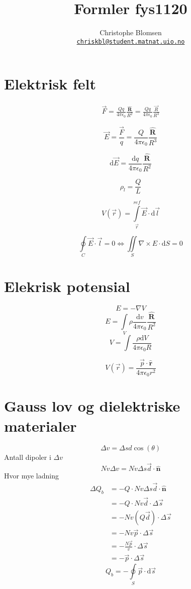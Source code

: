 \documentclass[a4paper,10pt,english]{article}
\title{Formler fys1120}
\author{
		Christophe Blomsen\\
		\texttt{\href{mailto:chriskbl@student.matnat.uio.no}{chriskbl@student.matnat.uio.no}}
		}
\newcommand{\dd}[1]{\mathrm{d}#1}
\newcommand{\uvec}[1]{\boldsymbol{\hat{\textbf{#1}}}}
\begin{document}
	\begin{titlepage}
	\maketitle
	\tableofcontents
	\end{titlepage}


\section{Elektrisk felt}

\begin{align*}
	\vec{F} = \frac{Qq}{4 \pi \epsilon_0}	\frac{ \uvec{R}}{R^2} = \frac{ Qq}{4 \pi \epsilon_0} \frac{ \vec{R}}{R^3}
\end{align*}

\[
	\vec{E}= \frac{ \vec{F}}{q} = \frac{Q}{4 \pi \epsilon_0} \frac{\uvec{R}}{R^3}
\] 

\[
	\dd{ \vec{E}} = \frac{ \dd{ q} }{4 \pi \epsilon_0} \frac{ \uvec{R}}{R^2}
\] 

\[
\rho_l = \frac{ Q}{L}
\] 

\[
	V(\vec{r}) = \int \limits_{\vec{r}}^{ref} \vec{E} \cdot \dd{ \vec{l}} 
\] 

\[
	\oint \limits_C \vec{E} \cdot \vec{l} = 0 \Leftrightarrow \iint \limits_S \nabla \times E \cdot \dd{ S} =0
\] 
\section{Elekrisk potensial}

\[
	E = - \nabla V
\] 
\[
	E = \int \limits_V \rho \frac{ \dd{ v} }{4 \pi \epsilon_0} \frac{ \uvec{R}}{R^2}
\] 
\[
	V = \int \frac{\rho \dd{ V} }{4 \pi \epsilon_0 R}
\] 

\[
	V(\vec{r}) = \frac{ \vec{p} \cdot \uvec{r}}{4 \pi \epsilon_0 r^2}
\] 
\section{Gauss lov og dielektriske materialer}
\[
\Delta v = \Delta s d \cos( \theta) 
\] 
Antall dipoler i $\Delta v$
 \[
	 Nv \Delta v = Nv \Delta s \vec{d} \cdot \uvec{n}
\] 
Hvor mye ladning
\begin{align*}
	\Delta Q_b &= -Q \cdot Nv \Delta s \vec{d} \cdot \uvec{n}\\
		   &= -Q \cdot Nv \vec{d} \cdot \Delta \vec{s} \\
		   &= -Nv \left( Q \vec{d} \right) \cdot \Delta \vec{s}\\
		   &= - Nv \vec{p} \cdot \Delta \vec{s}\\
		   &= - \frac{ N \vec{p}}{v} \cdot \Delta \vec{s} \\
		   &= - \vec{p} \cdot \Delta \vec{s}
\end{align*} 
\[
	Q_b = - \oint \limits_S \vec{p} \cdot \dd{ \vec{s}} 
\] 
\end{document}
